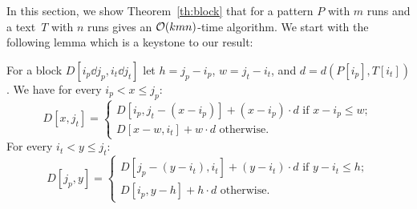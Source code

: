 In this section, we show Theorem~\ref{th:block} that for a pattern $P$ with $m$ runs and a text~$T$ with $n$ runs gives an $\mathcal{O}(kmn)$-time algorithm. We start with the following lemma which is a keystone to our result: 

\begin{lemma}\label{lm:border}
For a block $D[i_p \dd j_p, i_t \dd j_t]$ let $h=j_p-i_p$, $w =j_t-i_t$, and $d=d(P[i_p],T[i_t])$. We have for every $i_p < x \leq j_p$:
\begin{equation}\label{eq:border-right}
D[x,j_t]= \begin{cases}
D[i_p,j_t-(x-i_p)]+(x-i_p) \cdot d \text{ if } x-i_p \leq w; \\
D[x-w,i_t]+w \cdot d \text{ otherwise}.
\end{cases}
\end{equation}
For every $i_t < y \leq j_t$:
\begin{equation}\label{eq:border-bottom}
D[j_p,y]= \begin{cases}
D[j_p-(y-i_t),i_t]+(y-i_t) \cdot d \text{ if }  y-i_t \leq h; \\
D[i_p,y-h]+h \cdot d \text{ otherwise}.
\end{cases}
\end{equation}
\end{lemma}
